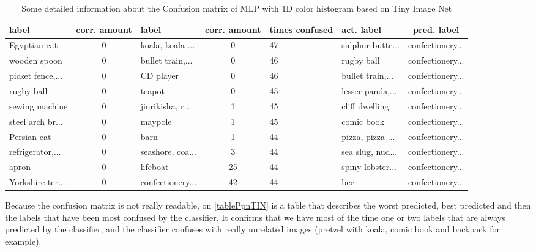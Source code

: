 \documentclass[11pt]{article}
\begin{document}
\begin{table}[h]
\begin{tabular}{lc|lc|llc}
\toprule
             label &  corr. amount &                    label &  corr. amount &  times confused & act. label &   pred. label \\
\midrule
     Egyptian cat &                        0 &  koala, koala ... &                        0 &              47 &  sulphur butte... &  confectionery... \\
     wooden spoon &                        0 &  bullet train,... &                        0 &              46 &        rugby ball &  confectionery... \\
 picket fence,... &                        0 &         CD player &                        0 &              46 &  bullet train,... &  confectionery... \\
       rugby ball &                        0 &            teapot &                        0 &              45 &  lesser panda,... &  confectionery... \\
   sewing machine &                        0 &  jinrikisha, r... &                        1 &              45 &    cliff dwelling &  confectionery... \\
 steel arch br... &                        0 &           maypole &                        1 &              45 &        comic book &  confectionery... \\
      Persian cat &                        0 &              barn &                        1 &              44 &  pizza, pizza ... &  confectionery... \\
 refrigerator,... &                        0 &  seashore, coa... &                        3 &              44 &  sea slug, nud... &  confectionery... \\
            apron &                        0 &          lifeboat &                       25 &              44 &  spiny lobster... &  confectionery... \\
 Yorkshire ter... &                        0 &  confectionery... &                       42 &              44 &               bee &  confectionery... \\
\bottomrule
\end{tabular}
\caption{Some detailed information about the Confusion matrix of MLP with 1D color histogram based on Tiny Image Net }
\label{tableMlpTIN}
\end{table} 

Because the confusion matrix is not really readable, on \ref{tablePpnTIN} is a table that describes the worst predicted, best predicted and then the labels that have been most confused by the classifier. It confirms that we have most of the time one or two labels that are always predicted by the classifier, and the classifier confuses with really unrelated images (pretzel with koala, comic book and backpack for example).
\end{document}
